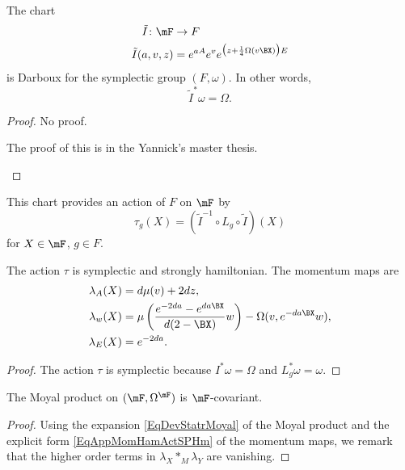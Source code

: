 \begin{proposition}
The chart \begin{equation}
\begin{aligned}
 \tilde I\colon \mF&\to F \\
\tilde I(a,v,z)&=  e^{aA} e^{v} e^{\big(z+\frac{1}{ 4 }\Omega(v\BX )\big)E}
\end{aligned}
\end{equation}
is Darboux for the symplectic group $(F,\omega)$. In other words,
\[
  \tilde I^*\omega=\Omega.
\]
\end{proposition}
\begin{proof}
No proof.
\begin{probleme}
    The proof of this is in the Yannick's master thesis.
\label{ProbMemYan}
\end{probleme}

\end{proof}

This chart provides an action of $F$ on $\mF$ by
\[
  \tau_{g}(X)=(\tilde I^{-1}\circ L_{g}\circ \tilde I)(X)
\]
for $X\in\mF$, $g\in F$.\begin{proposition}
The action $\tau$ is symplectic and strongly hamiltonian. The momentum maps are
\begin{subequations}\label{EqAppMomHamActSPHm}
\begin{align}
  \lambda_{A}(X)&=d\mu(v)+2dz,\\
\lambda_{w}(X)&=\mu\left( \frac{  e^{-2da}- e^{da\BX } }{ d(2-\BX ) }w \right)-\Omega(v, e^{-da\BX }w),\\
\lambda_{E}(X)&= e^{-2da}.
\end{align}
\end{subequations}
\end{proposition}

\begin{proof}
The action $\tau$ is symplectic because $I^*\omega=\Omega$ and $L_{g}^*\omega=\omega$.
\end{proof}

\begin{proposition}
The Moyal product on $(\mF,\Omega^{\mF})$ is $\mF$-covariant.
\end{proposition}

\begin{proof}
Using the expansion \eqref{EqDevStatrMoyal} of the Moyal product and the explicit form \eqref{EqAppMomHamActSPHm} of the momentum maps, we remark that the higher order terms in $\lambda_{X}\ast_{M}\lambda_{Y}$ are vanishing.
\end{proof}

